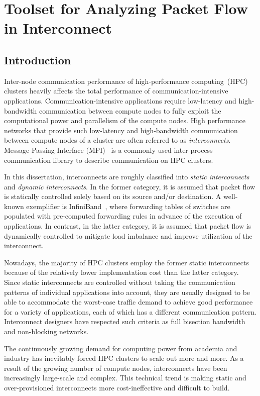 \chapter{Toolset for Analyzing Packet Flow in Interconnect}\label{sec:ii}

\section{Introduction}\label{sec:ii-introduction}

Inter-node communication performance of high-performance computing~(HPC)
clusters heavily affects the total performance of
communication-intensive applications. Communication-intensive
applications require low-latency and high-bandwidth communication
between compute nodes to fully exploit the computational power and
parallelism of the compute nodes. High performance networks that
provide such low-latency and high-bandwidth communication between
compute nodes of a cluster are often referred to as
\emph{interconnects}. Message Passing Interface
(MPI)~\autocite{MessagePassingInterfaceForum2015,Gropp2014} is a
commonly used inter-process communication library to describe
communication on HPC clusters.

In this dissertation, interconnects are roughly classified into \emph{static
interconnects} and \emph{dynamic interconnects}. In the former category,
it is assumed that packet flow is statically controlled solely based on its
source and/or destination. A well-known exemplifier is
InfiniBand~\autocite{Buyya2009}, where forwarding tables of switches are
populated with pre-computed forwarding rules in advance of the execution of
applications. In contrast, in the latter category, it is assumed that packet
flow is dynamically controlled to mitigate load imbalance and improve
utilization of the interconnect.

Nowadays, the majority of HPC clusters employ the former static
interconnects because of the relatively lower implementation cost than the
latter category. Since static interconnects are controlled without taking the
communication patterns of individual applications into account, they are
usually designed to be able to accommodate the worst-case traffic demand to
achieve good performance for a variety of applications, each of which has a
different communication pattern. Interconnect designers have respected such
criteria as full bisection bandwidth and non-blocking networks.

The continuously growing demand for computing power from academia and
industry has inevitably forced HPC clusters to scale out more and more.
As a result of the growing number of compute nodes, interconnects
have been increasingly large-scale and complex. This technical trend is making
static and over-provisioned interconnects more cost-ineffective and
difficult to build.

